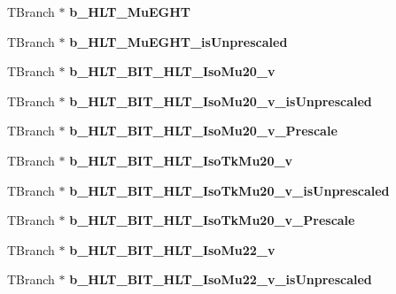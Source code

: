 \begin{DoxyCompactItemize}
\hypertarget{classMiniTree_a1afc6f94a4078508daf4920f47aa229c}{}\label{classMiniTree_a1afc6f94a4078508daf4920f47aa229c} 
T\+Branch $\ast$ {\bfseries b\+\_\+\+H\+L\+T\+\_\+\+Mu\+E\+G\+HT}
\item 
\hypertarget{classMiniTree_afb614edac6fb678f14b452410e6906f7}{}\label{classMiniTree_afb614edac6fb678f14b452410e6906f7} 
T\+Branch $\ast$ {\bfseries b\+\_\+\+H\+L\+T\+\_\+\+Mu\+E\+G\+H\+T\+\_\+is\+Unprescaled}
\item 
\hypertarget{classMiniTree_ab010d2084a854833eafddcead83ded74}{}\label{classMiniTree_ab010d2084a854833eafddcead83ded74} 
T\+Branch $\ast$ {\bfseries b\+\_\+\+H\+L\+T\+\_\+\+B\+I\+T\+\_\+\+H\+L\+T\+\_\+\+Iso\+Mu20\+\_\+v}
\item 
\hypertarget{classMiniTree_ae70c6d7014d83ad0770e8a66dbbf6910}{}\label{classMiniTree_ae70c6d7014d83ad0770e8a66dbbf6910} 
T\+Branch $\ast$ {\bfseries b\+\_\+\+H\+L\+T\+\_\+\+B\+I\+T\+\_\+\+H\+L\+T\+\_\+\+Iso\+Mu20\+\_\+v\+\_\+is\+Unprescaled}
\item 
\hypertarget{classMiniTree_a49b66e28493c7dca819944067ac9dcd5}{}\label{classMiniTree_a49b66e28493c7dca819944067ac9dcd5} 
T\+Branch $\ast$ {\bfseries b\+\_\+\+H\+L\+T\+\_\+\+B\+I\+T\+\_\+\+H\+L\+T\+\_\+\+Iso\+Mu20\+\_\+v\+\_\+\+Prescale}
\item 
\hypertarget{classMiniTree_a23d15ab6e5df5c305e8f4d535c897717}{}\label{classMiniTree_a23d15ab6e5df5c305e8f4d535c897717} 
T\+Branch $\ast$ {\bfseries b\+\_\+\+H\+L\+T\+\_\+\+B\+I\+T\+\_\+\+H\+L\+T\+\_\+\+Iso\+Tk\+Mu20\+\_\+v}
\item 
\hypertarget{classMiniTree_ac8af5d592b055a962d5669088f711b86}{}\label{classMiniTree_ac8af5d592b055a962d5669088f711b86} 
T\+Branch $\ast$ {\bfseries b\+\_\+\+H\+L\+T\+\_\+\+B\+I\+T\+\_\+\+H\+L\+T\+\_\+\+Iso\+Tk\+Mu20\+\_\+v\+\_\+is\+Unprescaled}
\item 
\hypertarget{classMiniTree_aca5dba45f426b89be87741f3ea1d59ad}{}\label{classMiniTree_aca5dba45f426b89be87741f3ea1d59ad} 
T\+Branch $\ast$ {\bfseries b\+\_\+\+H\+L\+T\+\_\+\+B\+I\+T\+\_\+\+H\+L\+T\+\_\+\+Iso\+Tk\+Mu20\+\_\+v\+\_\+\+Prescale}
\item 
\hypertarget{classMiniTree_aaaa8c063e5b4091399ed835a0e5eee49}{}\label{classMiniTree_aaaa8c063e5b4091399ed835a0e5eee49} 
T\+Branch $\ast$ {\bfseries b\+\_\+\+H\+L\+T\+\_\+\+B\+I\+T\+\_\+\+H\+L\+T\+\_\+\+Iso\+Mu22\+\_\+v}
\item 
\hypertarget{classMiniTree_aa7f363395b8a17724ed4decf8a47c62c}{}\label{classMiniTree_aa7f363395b8a17724ed4decf8a47c62c} 
T\+Branch $\ast$ {\bfseries b\+\_\+\+H\+L\+T\+\_\+\+B\+I\+T\+\_\+\+H\+L\+T\+\_\+\+Iso\+Mu22\+\_\+v\+\_\+is\+Unprescaled}

\end{DoxyCompactItemize}
